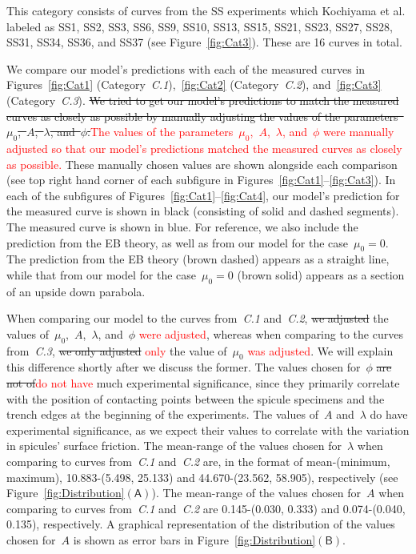 \documentclass[preprint,10pt,times]{elsarticle}
\numberwithin{equation}{section}
\newcommand{\pr}[1]{\left( #1 \right)}
\newcommand{\subf}[1]{\pr{\textsf{#1}}}
\begin{document}
This category consists of curves from the SS experiments which Kochiyama
et al. labeled as SS1, SS2, SS3, SS6, SS9, SS10, SS13, SS15, SS21,
SS23, SS27, SS28, SS31, SS34, SS36, and SS37 (see Figure~\ref{fig:Cat3}).
These are 16 curves in total.

We compare our model's predictions with each of the measured curves
in Figures~\ref{fig:Cat1} (Category~\textit{C.1}),~\ref{fig:Cat2}
(Category~\textit{C.2}), and~\ref{fig:Cat3} (Category~\textit{C.3}).
\sout{We tried to get our model's predictions to match the measured curves
as closely as possible by manually adjusting the values of the parameters~$\mu_0$,~$A$,~$\lambda$,
and~$\phi$.}\textcolor{red}{The values of the parameters~$\mu_0$,~$A$,~$\lambda$,
and~$\phi$ were manually adjusted so that our model's predictions matched the measured curves as closely as possible.} These manually chosen values are shown alongside each
comparison (see top right hand corner of each subfigure in Figures~\ref{fig:Cat1}--\ref{fig:Cat3}).
In each of the subfigures of Figures~\ref{fig:Cat1}--\ref{fig:Cat4},
our model's prediction for the measured curve is shown in black (consisting
of solid and dashed segments). The measured curve is shown in blue.
For reference, we also include the prediction from the EB theory,
as well as from our model for the case~$\mu_0=0$. The prediction
from the EB theory (brown dashed) appears as a straight line, while
that from our model for the case~$\mu_0=0$ (brown solid) appears
as a section of an upside down parabola.

When comparing our model to the curves from~\textit{C.1} and~\textit{C.2},
\sout{we adjusted} the values of~$\mu_0$,~$A$,~$\lambda$, and~$\phi$ \textcolor{red}{were adjusted},
whereas when comparing to the curves from~\textit{C.3}, \sout{we only adjusted} \textcolor{red}{only}
the value of~$\mu_0$ \textcolor{red}{was adjusted}. We will explain this difference shortly after
we discuss the former. The values chosen for~$\phi$ \sout{are not of}\textcolor{red}{do not have} much
experimental significance, since they primarily correlate with the
position of contacting points between the spicule specimens and the
trench edges at the beginning of the experiments. The values of~$A$
and~$\lambda$ do have experimental significance, as we expect their
values to correlate with the variation in spicules' surface friction.
The mean-range of the values chosen for~$\lambda$ when comparing
to curves from~\textit{C.1} and~\textit{C.2} are, in the format
of mean-(minimum, maximum), 10.883-(5.498, 25.133) and 44.670-(23.562,
58.905), respectively (see Figure~\ref{fig:Distribution}$\subf{A}$).
The mean-range of the values chosen for~$A$ when comparing to curves
from~\textit{C.1} and~\textit{C.2} are 0.145-(0.030, 0.333) and
0.074-(0.040, 0.135), respectively. A graphical representation of
the distribution of the values chosen for~$A$ is shown as error
bars in Figure~\ref{fig:Distribution}$\subf{B}$.
\end{document}
